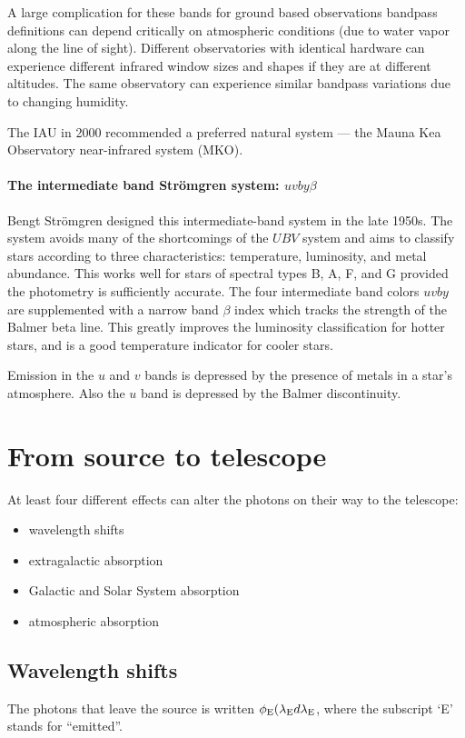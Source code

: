 A large complication for these bands for ground based observations
bandpass definitions can depend critically on atmospheric conditions
(due to water vapor along the line of sight). Different observatories
with identical hardware can experience different infrared window sizes
and shapes if they are at different altitudes. The same observatory
can experience similar bandpass variations due to changing humidity. 

The IAU in 2000 recommended a preferred natural system --- the Mauna
Kea Observatory near-infrared system (MKO).
\paragraph{The intermediate band Str\"omgren system: $uvby\beta$}
Bengt Str\"omgren designed this intermediate-band system in the late
1950s. The system avoids many of the shortcomings of the $UBV$ system
and aims to classify stars according to three characteristics:
temperature, luminosity, and metal abundance. This works well for
stars of spectral types B, A, F, and G provided the photometry is
sufficiently accurate. The four intermediate band colors $uvby$ are
supplemented with a narrow band $\beta$ index which tracks the
strength of the Balmer beta line. This greatly improves the
luminosity classification for hotter stars, and is a good temperature
indicator for cooler stars.

Emission in the $u$ and $v$ bands is depressed by the presence of
metals in a star's atmosphere. Also the $u$ band is depressed by the
Balmer discontinuity. 

\section{From source to telescope}
At least four different effects can alter the photons on their way to
the telescope:
\begin{itemize}
\item wavelength shifts
\item extragalactic absorption
\item Galactic and Solar System absorption
\item atmospheric absorption
\end{itemize}
\subsection{Wavelength shifts}
The photons that leave the source is written $\phi_{\rm
  E}(\lambda_{\rm E}d\lambda_{\rm E}$, where the subscript `E' stands
for ``emitted''. 

